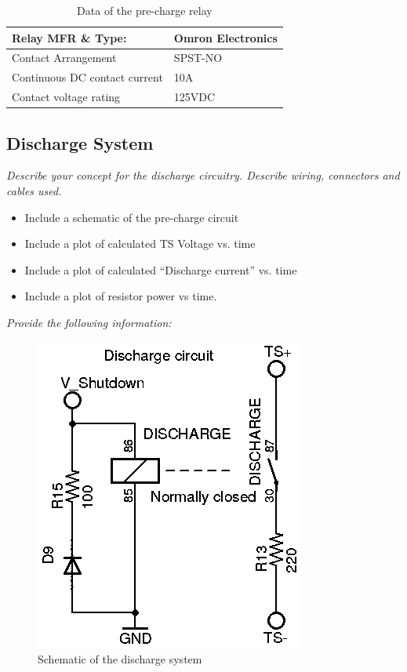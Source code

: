 \documentclass{article}
\begin{document}

    \begin{table}[H]
    \centering
    \begin{tabular}{|l|l|}
    \hline
    Relay MFR \& Type: & Omron Electronics \\ \hline
    Contact Arrangement & SPST-NO \\ \hline
    Continuous DC contact current & 10A \\ \hline
    Contact voltage rating & 125VDC \\ \hline
    \end{tabular}
    \caption{Data of the pre-charge relay}
    \label{prechargerelaytable}
    \end{table}

    \subsection{Discharge System}


    \textit{Describe your concept for the discharge circuitry. Describe wiring, connectors and cables used.}

    \begin{itemize}
        \item Include a schematic of the pre-charge circuit
        \item Include a plot of calculated TS Voltage vs. time
        \item Include a plot of calculated “Discharge current” vs. time
        \item Include a plot of resistor power vs time.
    \end{itemize}

\textit{Provide the following information:}

\begin{figure}[H]
    \centering
    \includegraphics[width = 0.3 \textwidth]{discharge}
    \caption{Schematic of the discharge system}
    \label{dischargeschem}
\end{figure}
\end{document}
